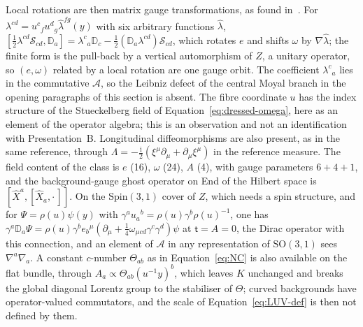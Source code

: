 Local rotations are then matrix gauge transformations, as found in~\cite{HanadaKawaiKimura2006}. For \(\lambda^{cd}=u^c{}_fu^d{}_g\hat\lambda^{fg}(y)\) with six arbitrary functions \(\hat\lambda\), \([\tfrac12\lambda^{cd}\mathcal S_{cd},\mathbb D_a]=\lambda^c{}_a\mathbb D_c-\tfrac12(\mathbb D_a\lambda^{cd})\mathcal S_{cd}\), which rotates \(e\) and shifts \(\omega\) by \(\nabla\hat\lambda\); the finite form is the pull-back by a vertical automorphism of \(Z\), a unitary operator, so \((e,\omega)\) related by a local rotation are one gauge orbit. The coefficient \(\lambda^c{}_a\) lies in the commutative \(\mathcal A\), so the Leibniz defect of the central Moyal branch in the opening paragraphs of this section is absent. The fibre coordinate \(u\) has the index structure of the Stueckelberg field of Equation~\eqref{eq:dressed-omega}, here as an element of the operator algebra; this is an observation and not an identification with Presentation~B. Longitudinal diffeomorphisms are also present, as in the same reference, through \(\Lambda=-\tfrac{\mathrm i}2(\xi^\mu\partial_\mu+\partial_\mu\xi^\mu)\) in the reference measure. The field content of the class is \(e\) (16), \(\omega\) (24), \(A\) (4), with gauge parameters \(6+4+1\), and the background-gauge ghost operator on End of the Hilbert space is \([\hat X^a,[\hat X_a,\cdot\,]]\). On the \(\mathrm{Spin}(3,1)\) cover of \(Z\), which needs a spin structure, and for \(\Psi=\rho(u)\psi(y)\) with \(\gamma^au_a{}^b=\rho(u)\gamma^b\rho(u)^{-1}\), one has \(\gamma^a\mathbb D_a\Psi=\rho(u)\gamma^be_b{}^\mu(\partial_\mu+\tfrac14\omega_{\mu cd}\gamma^c\gamma^d)\psi\) at \(\mathsf t=A=0\), the Dirac operator with this connection, and an element of \(\mathcal A\) in any representation of \(\mathrm{SO}(3,1)\) sees \(\nabla^a\nabla_a\). A constant \(c\)-number \(\Theta_{ab}\) as in Equation~\eqref{eq:NC} is also available on the flat bundle, through \(A_a\propto\Theta_{ab}(u^{-1}y)^b\), which leaves \(K\) unchanged and breaks the global diagonal Lorentz group to the stabiliser of \(\Theta\); curved backgrounds have operator-valued commutators, and the scale of Equation~\eqref{eq:LUV-def} is then not defined by them.


